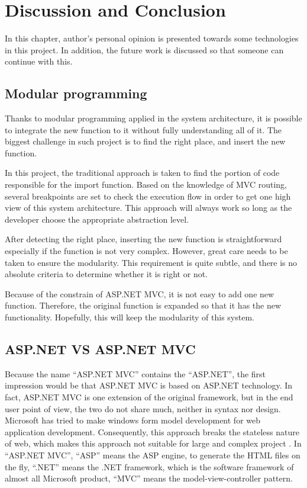 \chapter{Discussion and Conclusion}
\thispagestyle{empty}
In this chapter, author's personal opinion is presented towards some technologies in this project. In addition, the future work is discussed so that 
someone can continue with this.
\section{Modular programming}
Thanks to modular programming applied in the system architecture, it is possible to integrate the new function to it without fully understanding all 
of it. The biggest challenge in such project is to find the right place, and insert the new function.

In this project, the traditional approach is taken to find the portion of code responsible for the import function. Based on the knowledge of MVC 
routing, several breakpoints are set to check the execution flow in order to get one high view of this system architecture. This approach will always 
work so long as the developer choose the appropriate abstraction level.

After detecting the right place, inserting the new function is straightforward especially if the function is not very complex. However, great care 
needs to be taken to ensure the modularity. This requirement is quite subtle, and there is no absolute criteria to determine whether it is right or 
not.

Because of the constrain of ASP.NET MVC, it is not easy to add one new function. Therefore, the original function is expanded so that it has the new 
functionality. Hopefully, this will keep the modularity of this system.
\section{ASP.NET VS ASP.NET MVC}
Because the name ``ASP.NET MVC'' contains the ``ASP.NET'', the first impression would be that ASP.NET MVC is based on ASP.NET technology. In fact, 
ASP.NET MVC is one extension of the original framework, but in the end user point of view, the two do not share much, neither in syntax nor design. 
Microsoft has tried to make windows form model development for web application development. Consequently, this approach breaks the stateless nature 
of web, which makes this approach not suitable for large and complex project \cite{mvc_vs_webform}. In ``ASP.NET MVC'', ``ASP'' means the ASP engine, 
to generate the HTML files on the fly, ``.NET'' means the .NET framework, which is the software framework of almost all Microsoft product, ``MVC'' 
means the model-view-controller pattern.

